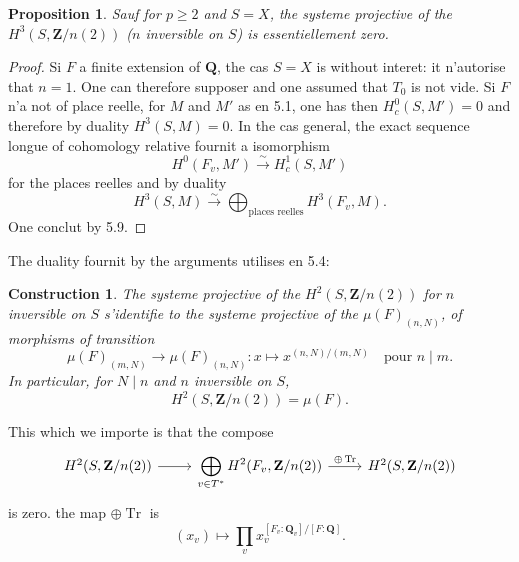\documentclass[11pt,a4paper]{article}
\theoremstyle{plain}
\newtheorem{proposition}[theorem]{Proposition}
\newtheorem{construction}[theorem]{Construction}
\theoremstyle{definition}
\DeclareMathOperator{\Tr}{Tr}
\begin{document}
\begin{proposition}\label{6.2}
Sauf for $p \geq 2$ and $S = X$, the systeme projective of the $H^3(S, \mathbf{Z}/n(2))$ ($n$ inversible on $S$) is essentiellement zero.
\end{proposition}

\begin{proof}
Si $F$ a finite extension of $\mathbf{Q}$, the cas $S = X$ is without interet: it n'autorise that $n = 1$. One can therefore supposer and one assumed that $T_0$ is not vide. Si $F$ n'a not of place reelle, for $M$ and $M'$ as en 5.1, one has then $H^0_c(S, M') = 0$ and therefore by duality $H^3(S, M) = 0$. In the cas general, the exact sequence longue of cohomology relative fournit a isomorphism
\[
H^0(F_v, M') \xrightarrow{\sim} H^1_c(S, M')
\]
for the places reelles
and by duality
\[
H^3(S, M) \xrightarrow{\sim} \bigoplus_{\text{places reelles}} H^3(F_v, M).
\]
One conclut by 5.9.
\end{proof}

The duality fournit by the arguments utilises en 5.4:

\begin{construction}\label{6.3}
The systeme projective of the $H^2(S, \mathbf{Z}/n(2))$ for $n$ inversible on $S$ s'identifie to the systeme projective of the $\mu(F)_{(n,N)}$, of morphisms of transition
\[
\mu(F)_{(m,N)} \to \mu(F)_{(n,N)} : x \mapsto x^{(n,N)/(m,N)} \quad \text{pour } n \mid m.
\]
In particular, for $N \mid n$ and $n$ inversible on $S$,
\begin{equation}\label{6.3.1}
H^2(S, \mathbf{Z}/n(2)) = \mu(F).
\end{equation}
\end{construction}

This which we importe is that the compose
\begin{equation}\label{6.3.2}
\begin{tikzcd}
H^2(S, \mathbf{Z}/n(2)) \arrow{r} & \displaystyle\bigoplus_{v \in T^*} H^2(F_v, \mathbf{Z}/n(2)) \arrow{r}{\oplus \Tr} & H^2(S, \mathbf{Z}/n(2))
\end{tikzcd}
\end{equation}
is zero. the map $\oplus \Tr$ is
\begin{equation}\label{6.3.3}
(x_v) \mapsto \prod_v x_v^{[F_v:\mathbf{Q}_v]/[F:\mathbf{Q}]}.
\end{equation}

\subsection{}\label{6.4}
\end{document}
